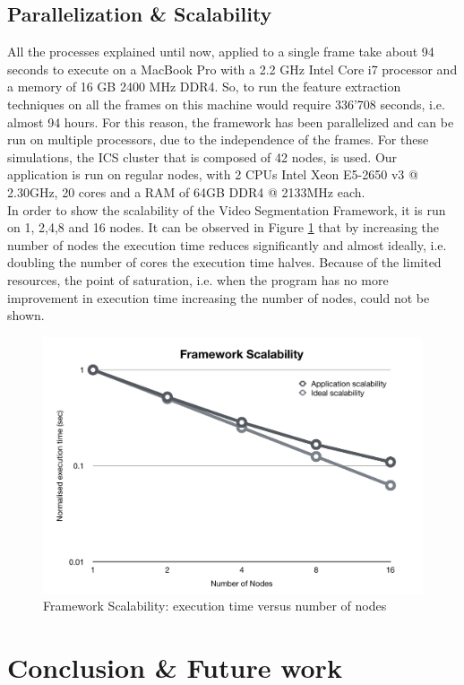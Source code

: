 \documentclass{usiinftr}
\begin{document}
\subsection{Parallelization \& Scalability}
All the processes explained until now, applied to a single frame take about 94 seconds to execute on a MacBook Pro with a 2.2 GHz Intel Core i7 processor and a memory of 16 GB 2400 MHz DDR4. So, to run the feature extraction techniques on all the frames on this machine would require 336'708 seconds, i.e. almost 94 hours. For this reason, the framework has been parallelized and can be run on multiple processors, due to the independence of the frames. For these simulations, the ICS cluster that is composed of 42 nodes, is used. Our application is run on regular nodes, with 2 CPUs Intel Xeon E5-2650 v3 @ 2.30GHz, 20 cores and a RAM of 64GB DDR4 @ 2133MHz each. \\
In order to show the scalability of the Video Segmentation Framework, it is run on 1, 2,4,8 and 16 nodes. It can be observed in Figure \ref{fig:9} that by increasing the number of nodes the execution time reduces significantly and almost ideally, i.e. doubling the number of cores the execution time halves. Because of the limited resources, the point of saturation, i.e. when the program has no more improvement in execution time increasing the number of nodes, could not be shown.

\begin{figure}[h]
	\centering
	\includegraphics[width=0.7\linewidth]{img/scalability}
	\caption{Framework Scalability: execution time versus number of nodes}
	\label{fig:9}
\end{figure}


\section{Conclusion \& Future work }
\end{document}
